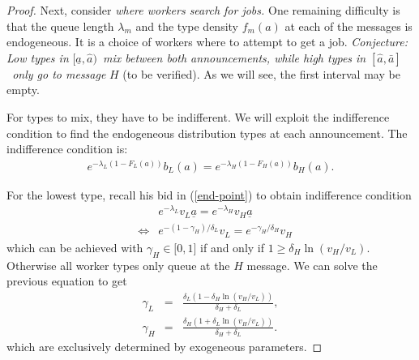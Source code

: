 \documentclass[12pt]{article}
\begin{document}
\begin{proof}
Next, consider \textit{where workers search for jobs.}
One remaining difficulty is that the queue length $\lambda _{m}$ and the type density $f_{m}(a)$ at each of the messages is endogeneous.
It is a choice of workers where to attempt to get a job. \textit{Conjecture: Low types in }$[%
\underline{a},\hat{a})$\textit{\ mix between both announcements, while high
types in }$[\hat{a},\bar{a}]$\textit{\ only go to message }$H$ (to be verified). As we will see, the first interval may be empty.

For types to mix, they have to be indifferent.
We will exploit the indifference condition to find the endogeneous distribution types at each announcement.
The indifference condition is:
\begin{align} \label{indiff}
e^{-\lambda _{L}(1-F_{L}(a))}b_{L}(a)=e^{-\lambda _{H}(1-F_{H}(a))}b_{H}(a).
\end{align}

For the lowest type, recall his bid in (\ref{end-point}) to obtain indifference condition 
\begin{eqnarray}
&&e^{-\lambda _{L}}v_{L}\underline{a}=e^{-\lambda _{H}}v_{H}\underline{a} 
\nonumber \\
&\Leftrightarrow &e^{-(1-\gamma _{H})/\delta _{L}}v_{L}=e^{-\gamma
_{H}/\delta _{H}}v_{H}  \nonumber
\end{eqnarray}%
which can be achieved with $\gamma _{H}\in \lbrack 0,1]$ if and only if $1\geq \delta _{H}\ln (v_{H}/v_{L}).$
Otherwise all worker types only queue at the $H$ message.
We can solve the previous equation to get 
\begin{eqnarray}
\gamma _{L} &=&\frac{\delta _{L}(1-\delta _{H}\ln (v_{H}/v_{L}))}{\delta
_{H}+\delta _{L}},  \label{fractions} \\
\gamma _{H} &=&\frac{\delta _{H}(1+\delta _{L}\ln (v_{H}/v_{L}))}{\delta
_{H}+\delta _{L}}.  \nonumber
\end{eqnarray}%
which are exclusively determined by exogeneous parameters.


\end{proof}
\end{document}
